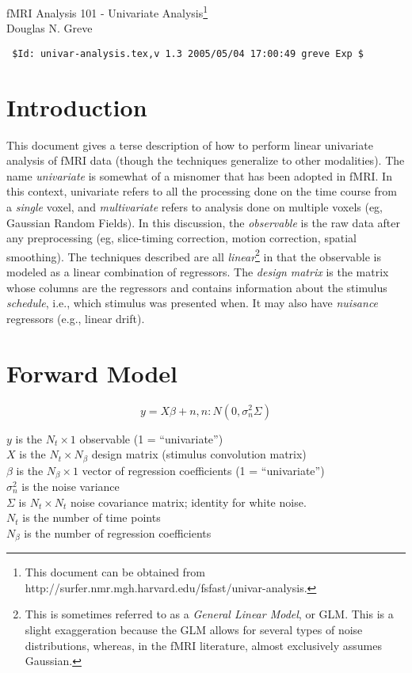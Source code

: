 \documentclass{article}
\begin{document}
\begin{LARGE}
\begin{center}
fMRI Analysis 101 - Univariate Analysis\footnote{This document can be
obtained from http://surfer.nmr.mgh.harvard.edu/fsfast/univar-analysis.}\\
Douglas N. Greve\\
\end{center}
\end{LARGE}
\begin{verbatim}
 $Id: univar-analysis.tex,v 1.3 2005/05/04 17:00:49 greve Exp $
\end{verbatim}

\section{Introduction}

This document gives a terse description of how to perform linear
univariate analysis of fMRI data (though the techniques generalize to
other modalities). The name {\em univariate} is somewhat of a misnomer
that has been adopted in fMRI.  In this context, univariate refers to
all the processing done on the time course from a {\em single} voxel,
and {\em multivariate} refers to analysis done on multiple voxels (eg,
Gaussian Random Fields). In this discussion, the {\em observable} is
the raw data after any preprocessing (eg, slice-timing correction,
motion correction, spatial smoothing). The techniques described are
all {\em linear}\footnote{This is sometimes referred to as a {\em
General Linear Model}, or GLM. This is a slight exaggeration because
the GLM allows for several types of noise distributions, whereas, in
the fMRI literature, almost exclusively assumes Gaussian.} in that the
observable is modeled as a linear combination of regressors. The {\em
design matrix} is the matrix whose columns are the regressors and
contains information about the stimulus {\em schedule}, i.e., which
stimulus was presented when. It may also have {\em nuisance}
regressors (e.g., linear drift).

\section{Forward Model}

\begin{equation}
y = X \beta + n, n: N(0,\sigma_n^2 \Sigma)
\end{equation}

\noindent
$y$ is the $N_t \times 1$ observable (1 = ``univariate'')\\
$X$ is the $N_t \times N_\beta$ design matrix (stimulus convolution matrix) \\
$\beta$ is the $N_\beta \times 1$ vector of regression coefficients (1 = ``univariate'')\\
$\sigma_n^2$ is the noise variance \\
$\Sigma$ is $N_t \times N_t$ noise covariance matrix; identity for
white noise.\\
$N_t$ is the number of time points\\
$N_\beta$ is the number of regression coefficients\\
\end{document}
